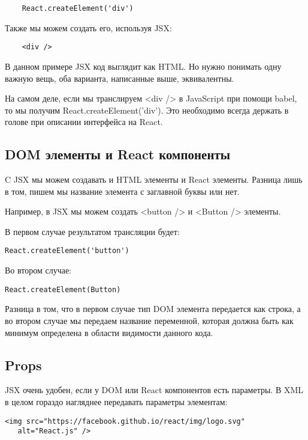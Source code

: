 \begin{lstlisting}
	React.createElement('div')
\end{lstlisting}

Также мы можем создать его, используя JSX:

\begin{lstlisting}
	<div />
\end{lstlisting}

В данном примере JSX код выглядит как HTML. Но нужно понимать одну важную вещь, оба варианта, написанные выше, эквивалентны. 

На самом деле, если мы транслируем <div /> в JavaScript при помощи babel, то мы получим React.createElement('div'). Это необходимо всегда держать в голове при описании интерфейса на React.

\subsection*{DOM элементы и React компоненты}

C JSX мы можем создавать и HTML элементы и React элементы. Разница лишь в том, пишем мы название элемента с заглавной буквы или нет.

Например, в JSX мы можем создать <button /> и <Button /> элементы.

В первом случае результатом трансляции будет:

\begin{lstlisting}
React.createElement('button')
\end{lstlisting}

Во втором случае:

\begin{lstlisting}
React.createElement(Button)
\end{lstlisting}

Разница в том, что в первом случае тип DOM элемента передается как строка, а во втором случае мы передаем название переменной, которая должна быть как минимум определена в области видимости данного кода.

\subsection*{Props}

JSX очень удобен, если у DOM или React компонентов есть параметры. В XML в целом гораздо нагляднее передавать параметры элементам:
   
\begin{lstlisting}
<img src="https://facebook.github.io/react/img/logo.svg"
   alt="React.js" />
\end{lstlisting}

